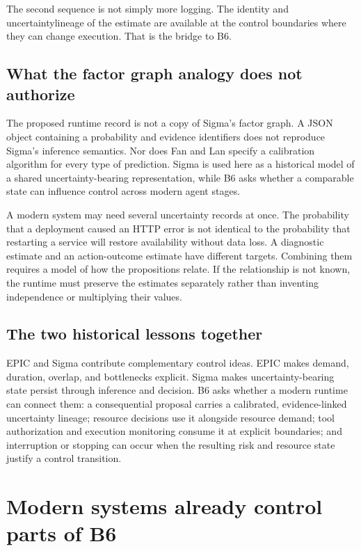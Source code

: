 The second sequence is not simply more logging. The identity and \gls{uncertaintylineage} of the estimate are available at the control boundaries where they can change execution. That is the bridge to B6.

\subsection{What the factor graph analogy does not authorize}

The proposed runtime record is not a copy of Sigma's factor graph. A JSON object containing a probability and evidence identifiers does not reproduce Sigma's inference semantics. Nor does Fan and Lan specify a calibration algorithm for every type of prediction. Sigma is used here as a historical model of a shared uncertainty-bearing representation, while B6 asks whether a comparable state can influence control across modern agent stages.

A modern system may need several uncertainty records at once. The probability that a deployment caused an HTTP error is not identical to the probability that restarting a service will restore availability without data loss. A diagnostic estimate and an action-outcome estimate have different targets. Combining them requires a model of how the propositions relate. If the relationship is not known, the runtime must preserve the estimates separately rather than inventing independence or multiplying their values.

\subsection{The two historical lessons together}
\label{sec:ch16-epic-sigma-together}

EPIC and Sigma contribute complementary control ideas. EPIC makes demand, duration, overlap, and bottlenecks explicit. Sigma makes uncertainty-bearing state persist through inference and decision. B6 asks whether a modern runtime can connect them: a consequential proposal carries a calibrated, evidence-linked uncertainty lineage; resource decisions use it alongside resource demand; tool authorization and execution monitoring consume it at explicit boundaries; and interruption or stopping can occur when the resulting risk and resource state justify a control transition.

\section{Modern systems already control parts of B6}
\label{sec:ch16-modern-baselines}

